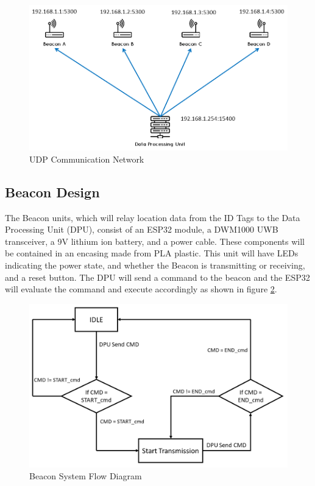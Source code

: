 \medskip
\begin{figure}[H]
\centering
    \includegraphics[scale=0.7]{./images/UDP.png}
    \caption{UDP Communication Network}
    \label{udp}
\end{figure}
\medskip



\pagebreak
\subsection{Beacon Design}
The Beacon units, which will relay location data from the ID Tags to the Data Processing Unit (DPU), consist of an ESP32 module, a DWM1000 UWB transceiver, a 9V lithium ion battery, and a power cable. These components will be contained in an encasing made from PLA plastic. This unit will have LEDs indicating the power state, and whether the Beacon is transmitting or receiving, and a reset button. The DPU will send a command to the beacon and the ESP32 will evaluate the command and execute accordingly as shown in figure \ref{bcn_flow}.

\medskip
\begin{figure}[H]
\centering
    \includegraphics[scale=0.40]{./images/beacon_flow.png}
    \caption{Beacon System Flow Diagram}
    \label{bcn_flow}
\end{figure}
\medskip

